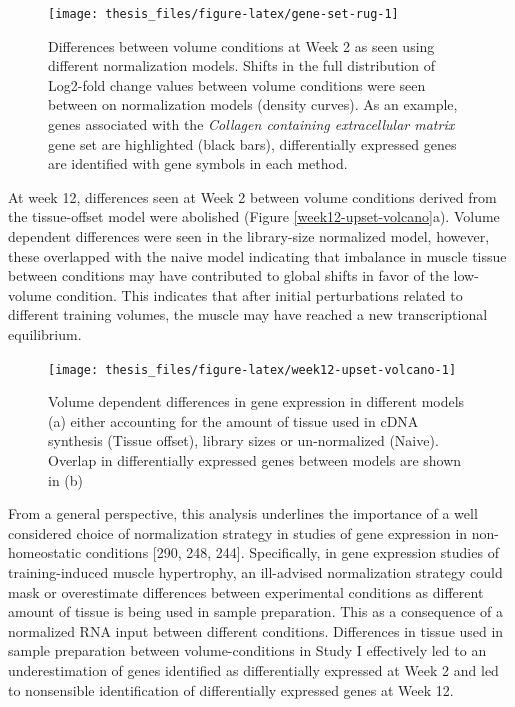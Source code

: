 \documentclass[twoside,10pt]{gihclass} %
\begin{document}
\begin{figure}

{\centering \texttt{[image: thesis\_files/figure-latex/gene-set-rug-1]} 

}

\caption[Global shifts in volume-dependent fold change as an effect of normalization methods at Week 2]{Differences between volume conditions at Week 2 as seen using different normalization models. Shifts in the full distribution of Log2-fold change values between volume conditions were seen between on normalization models (density curves). As an example, genes associated with the \textit{Collagen containing extracellular matrix} gene set are highlighted (black bars), differentially expressed genes are identified with gene symbols in each method.}\label{fig:gene-set-rug}
\end{figure}
At week 12, differences seen at Week 2 between volume conditions derived from the tissue-offset model were abolished (Figure \ref{week12-upset-volcano}a). Volume dependent differences were seen in the library-size normalized model, however, these overlapped with the naive model indicating that imbalance in muscle tissue between conditions may have contributed to global shifts in favor of the low-volume condition. This indicates that after initial perturbations related to different training volumes, the muscle may have reached a new transcriptional equilibrium.
\begin{figure}

{\centering \texttt{[image: thesis\_files/figure-latex/week12-upset-volcano-1]} 

}

\caption[General patterns of differentially expressed genes at Week 12]{Volume dependent differences in gene expression in different models (a) either accounting for the amount of tissue used in cDNA synthesis (Tissue offset), library sizes or un-normalized (Naive). Overlap in differentially expressed genes between models are shown in (b)}\label{fig:week12-upset-volcano}
\end{figure}
From a general perspective, this analysis underlines the importance of a well considered choice of normalization strategy in studies of gene expression in non-homeostatic conditions
{[}290, 248, 244{]}.
Specifically, in gene expression studies of training-induced muscle hypertrophy, an ill-advised normalization strategy could mask or overestimate differences between experimental conditions as different amount of tissue is being used in sample preparation. This as a consequence of a normalized RNA input between different conditions. Differences in tissue used in sample preparation between volume-conditions in Study I effectively led to an underestimation of genes identified as differentially expressed at Week 2 and led to nonsensible identification of differentially expressed genes at Week 12.
\end{document}
